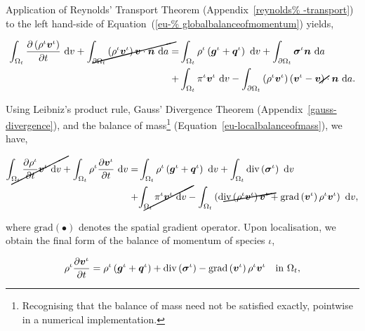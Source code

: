 Application of Reynolds' Transport Theorem (Appendix~\ref{reynolds%
  -transport}) to the left hand-side of Equation~(\ref{eu-%
  globalbalanceofmomentum}) yields,

\begin{equation*}
\begin{split}
\int_{\Omega_{t}} \frac{\partial
  \left(\rho^{\iota}\bv^{\iota}\right)}{\partial t} \ \mathrm{d}v
+\cancel{\int_{\partial \Omega_{t}}
  \left(\rho^{\iota}\bv^{\iota}\right) \bv \cdot \bn\ \mathrm{d}a} = &
\int_{\Omega_{t}} \rho^{\iota} \left(\bg^{\iota}+\bq^{\iota}\right)
\ \mathrm{d}v + \int_{\partial \Omega_{t}}
\Bsigma^{\iota}\bn\ \mathrm{d}a\\ + & \int_{\Omega_{t}}
\pi^{\iota}\bv^{\iota} \ \mathrm{d}v - \int_{\partial \Omega_{t}}
\left(\rho^{\iota} \bv^{\iota} \right)\left(\bv^{\iota} -
\cancel{\bv}\right) \cdot \bn\ \mathrm{d}a.
\end{split}
\end{equation*}

\noindent Using Leibniz's product rule, Gauss' Divergence Theorem
(Appendix~\ref{gauss-divergence}), and the balance of
mass{\footnote{Recognising that the balance of mass need not be
    satisfied exactly, pointwise in a numerical implementation.}}
(Equation~\ref{eu-localbalanceofmass}), we have,

\begin{equation*}
\begin{split}
\cancel{\int_{\Omega_{t}} \frac{\partial \rho^{\iota}} {\partial t}
  \bv^{\iota} \ \mathrm{d}v} + \int_{\Omega_{t}} \rho^{\iota}
\frac{\partial \bv^{\iota}} {\partial t} \ \mathrm{d}v = &
\int_{\Omega_{t}} \rho^{\iota} \left(\bg^{\iota}+\bq^{\iota}\right)
\ \mathrm{d}v + \int_{\Omega_{t}}
\mathrm{div}\left(\Bsigma^{\iota}\right)\ \mathrm{d}v\\ + &
\cancel{\int_{\Omega_{t}} \pi^{\iota}\bv^{\iota} \ \mathrm{d}v} -
\int_{\Omega_{t}}\left(\cancel{\mathrm{div}
  \left(\rho^{\iota}\bv^{\iota}\right) \bv^{\iota}} +
\mathrm{grad}\left(\bv^{\iota}\right)
\rho^{\iota}\bv^{\iota}\right)\ \mathrm{d}v,
\end{split}
\end{equation*}

\noindent where $\mathrm{grad} (\bullet)$ denotes the spatial gradient
operator. Upon localisation, we obtain the final form of the balance
of momentum of species $\iota$,

\begin{equation}
\rho^{\iota} \frac{\partial \mbox{\boldmath$ v$}^{\iota}} {\partial t} = \rho^{\iota}
\left(\mbox{\boldmath$ g$}^{\iota}+\mbox{\boldmath$ q$}^{\iota}\right) +
\mathrm{div}\left(\mbox{\boldmath$\sigma$}^{\iota}\right) -
\mathrm{grad}\left(\mbox{\boldmath$ v$}^{\iota}\right) \rho^{\iota}\mbox{\boldmath$ v$}^{\iota} \quad
\mathrm{in}\ \Omega_{t},
\label{eu-localbalanceofmomentum}
\end{equation}

